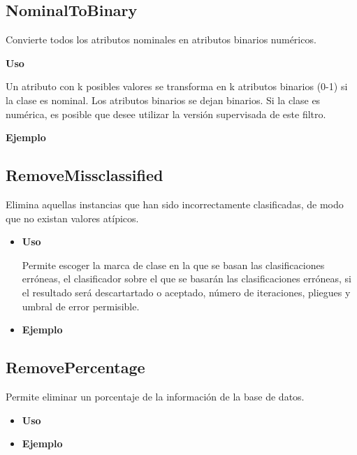 \newpage
	\subsection{NominalToBinary}
	Convierte todos los atributos nominales en atributos binarios numéricos. 	

	\begin{justify}
	\textbf{Uso} 
	\end{justify}
	
	Un atributo con k posibles valores se transforma en k atributos binarios (0-1) si la clase es nominal. Los atributos binarios se dejan binarios. Si la clase es numérica, es posible que desee utilizar la versión supervisada de este filtro.

	\begin{justify}
	\textbf{Ejemplo}
	\end{justify}






\newpage
	\subsection{RemoveMissclassified}
	\begin{justify}
	Elimina aquellas instancias que han sido incorrectamente clasificadas, de modo que no existan valores atípicos.
	\end{justify}
	\begin{itemize}
		\item \textbf{Uso}
	\begin{justify}
	Permite escoger la marca de clase en la que se basan las clasificaciones erróneas, el clasificador 	sobre el que se basarán las clasificaciones erróneas, si el resultado será descartartado o aceptado, número de iteraciones, pliegues y umbral de error permisible.
	\end{justify}
		\item \textbf{Ejemplo}
	\end{itemize}

	\subsection{RemovePercentage}
	\begin{justify}
	Permite eliminar un porcentaje de la información de la base de datos.
	\end{justify}
	\begin{itemize}
		\item \textbf{Uso}
	\begin{justify}

	\end{justify}
		\item \textbf{Ejemplo}
	\end{itemize}

